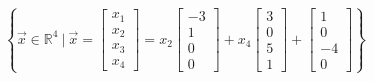 \begin{SaveQuestion}
\begin{enumerate}
        $$\left\{\vec x \in \mathbb{R}^4 \ | \ \vec x = \begin{bmatrix} x_1 \\ x_2 \\ x_3 \\ x_4 \end{bmatrix} = x_2 \begin{bmatrix} -3 \\ 1 \\ 0 \\ 0 \end{bmatrix} + x_4 \begin{bmatrix} 3 \\ 0 \\ 5 \\ 1 \end{bmatrix} + \begin{bmatrix} 1 \\ 0 \\ -4 \\ 0 \end{bmatrix}\right\}$$
        

\end{enumerate}
\end{SaveQuestion}
